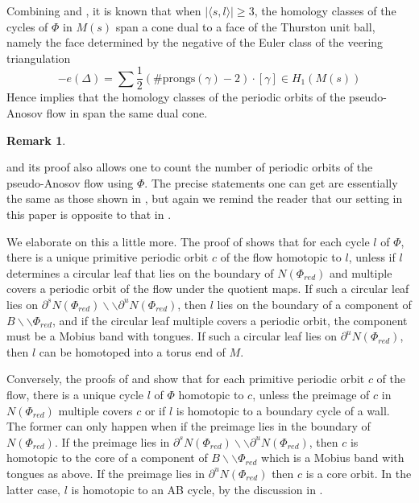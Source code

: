 \documentclass[12pt]{amsart}
\theoremstyle{definition}
\newtheorem{rmk}[thm]{Remark}
\numberwithin{equation}{section}
\begin{document}
Combining \cite[Theorem A]{Lan20} and \cite[Proposition 5.7]{LMT20}, it is known that when $|\langle s,l \rangle| \geq 3$, the homology classes of the cycles of $\Phi$ in $M(s)$ span a cone dual to a face of the Thurston unit ball, namely the face determined by the negative of the Euler class of the veering triangulation $$-e(\Delta)=\sum \frac{1}{2}(\text{\# prongs}(\gamma)-2) \cdot [\gamma] \in H_1(M(s))$$ Hence  implies that the homology classes of the periodic orbits of the pseudo-Anosov flow in  span the same dual cone. 

\begin{rmk} \label{rmk:LMTorbits}

 and its proof also allows one to count the number of periodic orbits of the pseudo-Anosov flow using $\Phi$. The precise statements one can get are essentially the same as those shown in \cite[Theorem 6.1]{LMT21}, but again we remind the reader that our setting in this paper is opposite to that in \cite{LMT21}.

We elaborate on this a little more. The proof of  shows that for each cycle $l$ of $\Phi$, there is a unique primitive periodic orbit $c$ of the flow homotopic to $l$, unless if $l$ determines a circular leaf that lies on the boundary of $N(\Phi_{red})$ and multiple covers a periodic orbit of the flow under the quotient maps. If such a circular leaf lies on $\partial^s N(\Phi_{red}) \backslash \backslash \partial^u N(\Phi_{red})$, then $l$ lies on the boundary of a component of $B \backslash \backslash \Phi_{red}$, and if the circular leaf multiple covers a periodic orbit, the component must be a Mobius band with tongues. If such a circular leaf lies on $\partial^u N(\Phi_{red})$, then $l$ can be homotoped into a torus end of $M$.

Conversely, the proofs of  and  show that for each primitive periodic orbit $c$ of the flow, there is a unique cycle $l$ of $\Phi$ homotopic to $c$, unless the preimage of $c$ in $N(\Phi_{red})$ multiple covers $c$ or if $l$ is homotopic to a boundary cycle of a wall. The former can only happen when if the preimage lies in the boundary of $N(\Phi_{red})$. If the preimage lies in $\partial^s N(\Phi_{red}) \backslash \backslash \partial^u N(\Phi_{red})$, then $c$ is homotopic to the core of a component of $B \backslash \backslash \Phi_{red}$ which is a Mobius band with tongues as above. If the preimage lies in $\partial^u N(\Phi_{red})$ then $c$ is a core orbit. In the latter case, $l$ is homotopic to an AB cycle, by the discussion in .
\end{rmk}
\end{document}
